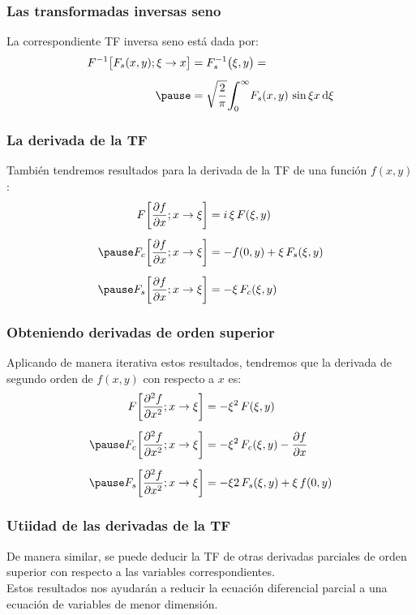 \documentclass[12pt]{beamer}
\begin{document}
\begin{frame}
\frametitle{Las transformadas inversas seno}
La correspondiente TF inversa seno está dada por:
\pause
\begin{eqnarray*}
\begin{aligned}
F^{-1} \big[ F_{s} (x, y); \xi \to x \big] &= F_{s}^{-1} \big( \xi, y \big) = \\[0.5em]  \pause
&= \sqrt{\dfrac{2}{\pi}} \scaleint{6ex}_{\bs 0}^{\infty} F_{s} (x, y) \, \sin \xi x \dd{\xi}
\end{aligned}
\end{eqnarray*}
\end{frame}
\begin{frame}
\frametitle{La derivada de la TF}
También tendremos resultados para la derivada de la TF de una función $f(x, y)$:
\pause
\begin{eqnarray*}
\begin{aligned}
F \bigg[ \pdv{f}{x}; x \to \xi \bigg] &= i \, \xi \, F (\xi, y) \\[0.5em] \pause
F_{c} \bigg[ \pdv{f}{x}; x \to \xi \bigg] &= - f(0, y) +  \xi \, F_{s} (\xi, y) \\[0.5em] \pause
F_{s} \bigg[ \pdv{f}{x}; x \to \xi \bigg] &= - \xi \, F_{c} (\xi, y)
\end{aligned}
\end{eqnarray*}
\end{frame}
\begin{frame}
\frametitle{Obteniendo derivadas de orden superior}
Aplicando de manera iterativa estos resultados, tendremos que la derivada de segundo orden de $f(x, y)$ con respecto a $x$ es:
\pause
\begin{eqnarray*}
\begin{aligned}
F \bigg[ \pdv[2]{f}{x}; x \to \xi \bigg] &= - \xi^{2} \, F (\xi, y) \\[0.5em] \pause
F_{c} \bigg[ \pdv[2]{f}{x}; x \to \xi \bigg] &= - \xi^{2} \, F_{c} (\xi, y) - \pdv{f}{x} (0, y) \\[0.5em] \pause
F_{s} \bigg[ \pdv[2]{f}{x}; x \to \xi \bigg] &= - \xi{2} \, F_{s} (\xi, y) + \xi \, f(0, y)
\end{aligned}
\end{eqnarray*}
\end{frame}
\begin{frame}
\frametitle{Utiidad de las derivadas de la TF}
De manera similar, se puede deducir la TF de otras derivadas parciales de orden superior con respecto a las variables correspondientes.
\\
\bigskip
\pause
Estos resultados nos ayudarán a reducir la ecuación diferencial parcial a una ecuación de variables de menor dimensión.
\end{frame}
\end{document}
